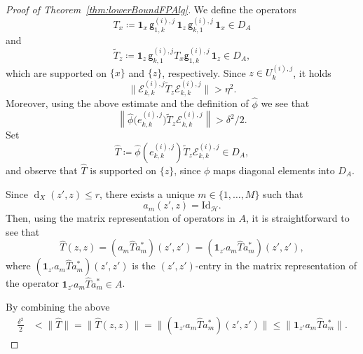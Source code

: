 \documentclass[a4paper]{amsart}
\newcommand{\myhyp}{\textnormal{-}\hskip0pt\relax}
\numberwithin{equation}{section}
\newcommand{\Ecal}{\mathcal{E}}
\newcommand{\Hcal}{\mathcal{H}}
\newcommand{\indF}{\mathbf{1}}
\newcommand{\id}[1]{\mathrm{Id}_{#1}}
\DeclareMathOperator{\dist}{d}
\newcommand{\norm}[1]{{\left\lVert #1 \right \rVert}}
\newcommand{\normbig}[1]{{\big\lVert #1 \big \rVert}}
\newcommand{\normBig}[1]{{\Big\lVert #1 \Big \rVert}}
\newcommand{\distX}[2]{{\dist_X ( #1, #2 )}}
\newcommand{\unMatImg}[3]{{\Ecal_{#3}^{(#1), #2}}}
\newcommand{\gUnMatImg}[3]{{ \mathsf{g}_{#3}^{(#1), #2}}}
\theoremstyle{plain}
\theoremstyle{indented}
\numberwithin{equation}{section}
\theoremstyle{definition}
\theoremstyle{remark}
\theoremstyle{plain}
\theoremstyle{definition}
\begin{document}
\begin{proof}[Proof of Theorem~\ref{thm:lowerBoundFPAlg}]
        We define the operators
        \begin{equation*}
            T_x \coloneq \indF_x \, \gUnMatImg{i}{j}{1,k} \, \indF_{z} \, \gUnMatImg{i}{j}{k,1} \, \indF_x \in D_A
        \end{equation*}
        and 
        \begin{equation*}
        \widetilde{T}_{z} \coloneq \indF_{z} \, \gUnMatImg{i}{j}{k,1} T_x \gUnMatImg{i}{j}{1,k} \, \indF_{z} \in D_A,
        \end{equation*}
        which are supported on $\{x\}$ and $\{z\}$, respectively.
        Since ${z \in U^{(i),j}_k}$, it holds
         \begin{equation*}
        \normbig{\unMatImg{i}{j}{k,k}  \widetilde{T}_{z} \unMatImg{i}{j}{k,k} }  > \eta^2.
    \end{equation*}
         Moreover, using the above estimate and the definition of ${\widehat{\phi}}$ we see that
        \begin{equation*}
            \norm{ \widehat{\phi}\Big(e_{k,k}^{(i),j} \Big)  \widetilde{T}_{z} \unMatImg{i}{j}{k,k}}  >  \delta^2/2.
        \end{equation*}
        Set 
       \begin{equation*}
           \widehat{T} \coloneq  \widehat{\phi}\left(e_{k,k}^{(i),j} \right)   \widetilde{T}_{z} \unMatImg{i}{j}{k,k} \in D_A,
       \end{equation*}
       and observe that $\widehat{T}$ is supported on $\{z\}$, 
       since $\phi$ maps diagonal elements into $D_A$.
        
        Since ${\distX{z'}{z} \le r}$, there exists a unique ${m \in \{1,\hdots,M\}}$ such that
     \[{a_m(z',z) = \id{\Hcal}}.\] 
        Then, using the matrix representation of operators in $A$, 
    it is straightforward to see that
    \begin{equation*}
                \widehat{T}(z,z) 
                = (a_m \widehat{T} a_m^\ast) (z',z') = (\indF_{z'} a_m \widehat{T} a_m^\ast) (z',z'),
    \end{equation*}
    where ${(\indF_{z'} a_m \widehat{T} a_m^\ast) (z',z')}$ is the ${(z',z')}$\myhyp{}entry in the matrix representation of the operator ${\indF_{z'} a_m \widehat{T} a_m^\ast\in A}$.

        By combining the above
        \begin{align*}
          \frac{\delta^2}{2}
          & <  \normBig{\widehat{T}} 
          = \normBig{\widehat{T}(z,z)}
          = \normBig{(\indF_{z'} a_m \widehat{T} a_m^\ast) (z',z')}
          \le \normBig{\indF_{z'} a_m \widehat{T} a_m^\ast }.
        \end{align*}


\end{proof}
\end{document}
